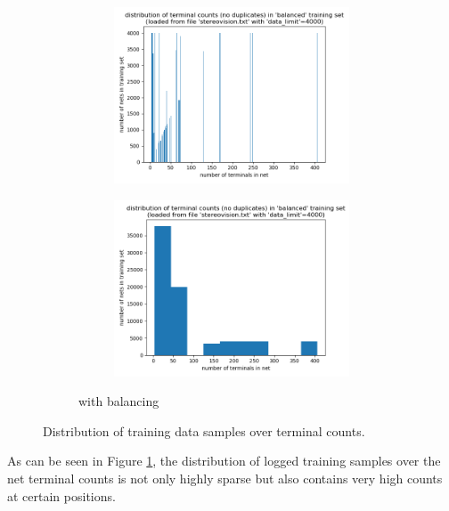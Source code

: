 \begin{figure}
\begin{subfigure}[b]{0.49\linewidth}
\begin{subfigure}[b]{\linewidth}
			\includegraphics[width=\linewidth]{plots/data-distribution-limited-fine.png}
		\end{subfigure}
		\begin{subfigure}[b]{\linewidth}
			\includegraphics[width=\linewidth]{plots/data-distribution-limited-coarse.png}
		\end{subfigure}
		\caption{with balancing}
	\end{subfigure}
	\caption{Distribution of training data samples over terminal counts.}
	\label{fig:data-hist}
\end{figure}

As can be seen in Figure \ref{fig:data-hist}, the distribution of logged training samples over the net terminal counts is not only highly sparse but also contains very high counts at certain positions.


